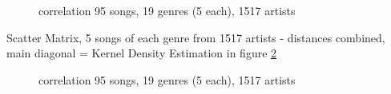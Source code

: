 \begin{figure}[htbp]
	\centering
	\caption{correlation 95 songs, 19 genres (5 each), 1517 artists}
	\label{fig:corr2}
\end{figure}

\noindent Scatter Matrix, 5 songs of each genre from 1517 artists - distances combined, main diagonal = Kernel Density Estimation in figure \ref{fig:corr3}
\begin{figure}[htbp]
	\centering
	\caption{correlation 95 songs, 19 genres (5 each), 1517 artists}
	\label{fig:corr3}
\end{figure}

